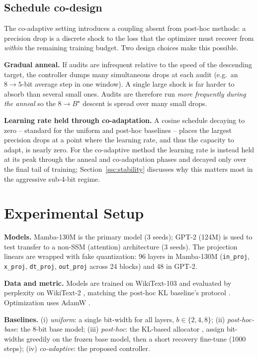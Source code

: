 \documentclass[conference]{IEEEtran}
\begin{document}
\subsection{Schedule co-design}
\label{ssc:schedule}
The co-adaptive setting introduces a coupling absent from post-hoc methods: a
precision drop is a discrete shock to the loss that the optimizer must recover
from \emph{within} the remaining training budget. Two design choices make this
possible.

\noindent\textbf{Gradual anneal.}
If audits are infrequent relative to the speed of the descending target, the
controller dumps many simultaneous drops at each audit (e.g.\ an
\(8\!\to\!5\)-bit average step in one window). A single large shock is far harder
to absorb than several small ones. Audits are therefore run \emph{more frequently
during the anneal} so the \(8\to B^\star\) descent is spread over many small
drops.

\noindent\textbf{Learning rate held through co-adaptation.}
A cosine schedule decaying to zero -- standard for the uniform and post-hoc
baselines -- places the largest precision drops at a point where the learning
rate, and thus the capacity to adapt, is nearly zero. For the co-adaptive method the
learning rate is instead held at its peak through the anneal and co-adaptation
phases and decayed only over the final tail of training; Section~\ref{ssc:stability}
discusses why this matters most in the aggressive sub-4-bit regime.

\section{Experimental Setup}
\label{sec:setup}
\noindent\textbf{Models.} Mamba-130M is the primary model (3 seeds); GPT-2 (124M)
is used to test transfer to a non-SSM (attention) architecture (3 seeds). The
projection linears are wrapped with fake quantization: 96 layers in Mamba-130M
(\texttt{in\_proj}, \texttt{x\_proj}, \texttt{dt\_proj}, \texttt{out\_proj} across
24 blocks) and 48 in GPT-2.

\noindent\textbf{Data and metric.} Models are trained on WikiText-103 and
evaluated by perplexity on WikiText-2 \cite{wikitext}, matching the post-hoc KL
baseline's protocol \cite{kllens}. Optimization uses AdamW \cite{adamw}.

\noindent\textbf{Baselines.}
(i) \emph{uniform}: a single bit-width for all layers, \(b\in\{2,4,8\}\);
(ii) \emph{post-hoc-base}: the 8-bit base model;
(iii) \emph{post-hoc}: the KL-based allocator \cite{kllens}, assign bit-widths
greedily on the frozen base model, then a short recovery fine-tune (1000 steps);
(iv) \emph{co-adaptive}: the proposed controller.
\end{document}
